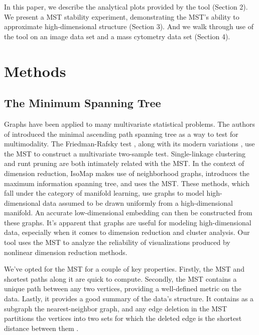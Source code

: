 \documentclass{article}
\begin{document}
In this paper, we describe the analytical plots provided by the tool (Section 2). We present a MST stability experiment, demonstrating the MST's ability to approximate high-dimensional structure (Section 3). And we walk through use of the tool on an image data set and a mass cytometry data set (Section 4).

\section{Methods}

\subsection{The Minimum Spanning Tree}
Graphs have been applied to many multivariate statistical problems. The authors of \cite{MAP test} introduced the minimal ascending path spanning tree as a way to test for multimodality. The Friedman-Rafsky test \cite{Friedman-Rafsky test}, along with its modern variations \cite{Friedman-Rafsky variation 1, Friedman-Rafsky variation 2, Friedman-Rafsky variation 3}, use the MST to construct a multivariate two-sample test. Single-linkage clustering \cite{single-linkage and MST} and runt pruning \cite{runt pruning} are both intimately related with the MST. In the context of dimension reduction, IsoMap \cite{IsoMap} makes use of neighborhood graphs, \cite{MIST example} introduces the maximum information spanning tree, and \cite{MST example} uses the MST. These methods, which fall under the category of manifold learning, use graphs to model high-dimensional data assumed to be drawn uniformly from a high-dimensional manifold. An accurate low-dimensional embedding can then be constructed from these graphs. It's apparent that graphs are useful for modeling high-dimensional data, especially when it comes to dimension reduction and cluster analysis. Our tool uses the MST to analyze the reliability of visualizations produced by nonlinear dimension reduction methods.

We've opted for the MST for a couple of key properties. Firstly, the MST and shortest paths along it are quick to compute. Secondly, the MST contains a unique path between any two vertices, providing a well-defined metric on the data. Lastly, it provides a good summary of the data's structure. It contains as a subgraph the nearest-neighbor graph, and any edge deletion in the MST partitions the vertices into two sets for which the deleted edge is the shortest distance between them \cite{Friedman-Rafsky test}.
\end{document}

